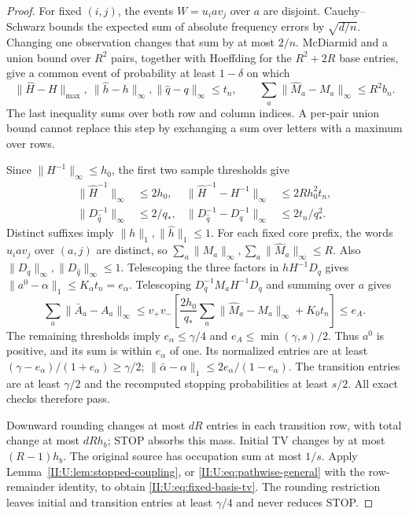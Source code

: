 \begin{proof}
For fixed $(i,j)$, the events $W=u_iav_j$ over $a$ are disjoint.
Cauchy--Schwarz bounds the expected sum of absolute frequency errors
by $\sqrt{d/n}$. Changing one observation changes that sum by at most
$2/n$. McDiarmid and a union bound over $R^2$ pairs, together with
Hoeffding for the $R^2+2R$ base entries, give a common event of
probability at least $1-\delta$ on which
\begin{equation}
 \|\widehat H-H\|_{\max},\ \|\widehat h-h\|_\infty,
 \|\widehat q-q\|_\infty\le t_n,
 \qquad
 \sum_a\|\widehat M_a-M_a\|_\infty\le R^2b_n.
 \label{II:U:eq:joint-count-event}
\end{equation}
The last inequality sums over both row and column indices. A
per-pair union bound cannot replace this step by exchanging a sum
over letters with a maximum over rows.

Since $\|H^{-1}\|_\infty\le h_0$, the first two sample thresholds give
\begin{align*}
 \|\widehat H^{-1}\|_\infty&\le2h_0,&
 \|\widehat H^{-1}-H^{-1}\|_\infty&\le2Rh_0^2t_n,\\
 \|D_{\widehat q}^{-1}\|_\infty&\le2/q_*,&
 \|D_{\widehat q}^{-1}-D_q^{-1}\|_\infty&\le2t_n/q_*^2.
\end{align*}
Distinct suffixes imply $\|h\|_1,\|\widehat h\|_1\le1$.
For each fixed core prefix, the words $u_iav_j$ over $(a,j)$ are
distinct, so
$\sum_a\|M_a\|_\infty,\sum_a\|\widehat M_a\|_\infty\le R$.
Also $\|D_q\|_\infty,\|D_{\widehat q}\|_\infty\le1$.
Telescoping the three factors in $hH^{-1}D_q$ gives
$\|a^0-\alpha\|_1\le K_\alpha t_n=e_\alpha$.
Telescoping $D_q^{-1}M_aH^{-1}D_q$ and summing over $a$ gives
\[
 \sum_a\|\bar A_a-A_a\|_\infty
 \le v_+v_-\left[
 \frac{2h_0}{q_*}\sum_a\|\widehat M_a-M_a\|_\infty+K_0t_n\right]
 \le e_A.
\]
The remaining thresholds imply $e_\alpha\le\gamma/4$ and
$e_A\le\min(\gamma,s)/2$. Thus $a^0$ is positive, and its sum is
within $e_\alpha$ of one. Its normalized entries are at least
$(\gamma-e_\alpha)/(1+e_\alpha)\ge\gamma/2$;
$\|\bar\alpha-\alpha\|_1\le2e_\alpha/(1-e_\alpha)$.
The transition entries are at least $\gamma/2$ and the recomputed
stopping probabilities at least $s/2$. All exact checks therefore pass.

Downward rounding changes at most $dR$ entries in each transition row,
with total change at most $dRh_b$; STOP absorbs this mass. Initial TV
changes by at most $(R-1)h_b$. The original source has occupation
sum at most $1/s$. Apply Lemma~\ref{II:U:lem:stopped-coupling}, or
\eqref{II:U:eq:pathwise-general} with the row-remainder identity, to obtain
\eqref{II:U:eq:fixed-basis-tv}. The rounding restriction leaves initial
and transition entries at least $\gamma/4$ and never reduces STOP.


\end{proof}
